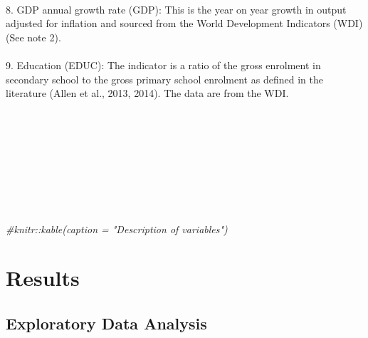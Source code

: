 \documentclass[a4paper,nobind]{templates/ociamthesis}
\newenvironment{Shaded}{\begin{snugshade}}{\end{snugshade}}
\newcommand{\CommentTok}[1]{\textcolor[rgb]{0.56,0.35,0.01}{\textit{#1}}}
\renewenvironment{Shaded}
{
  \vspace{10pt}%
  \begin{snugshade}%
}{%
  \end{snugshade}%
  \vspace{8pt}%
}
\begin{document}
\begin{table}
\begin{tabu}
\\
8. GDP annual growth rate (GDP): This is the year on year growth in output adjusted for inflation and sourced from the World Development Indicators (WDI) (See note 2).\\
\addlinespace
\\
9. Education (EDUC): The indicator is a ratio of the gross enrolment in secondary school to the gross primary school enrolment as defined in the literature (Allen et al., 2013, 2014). The data are from the WDI.\\
\\
\bottomrule
{}\\
\\
\\
\\
\\
\\
\\
\end{tabu}
\end{table}

\begin{Shaded}
\begin{Highlighting}[]
  \CommentTok{\#knitr::kable(caption = "Description of variables")}
\end{Highlighting}
\end{Shaded}

\hypertarget{results}{%
\section{Results}\label{results}}

\hypertarget{exploratory-data-analysis}{%
\subsection{Exploratory Data Analysis}\label{exploratory-data-analysis}}
\end{document}
